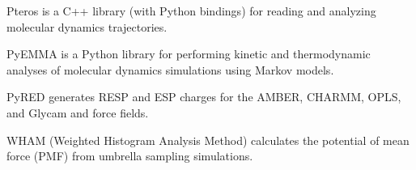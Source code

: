 Pteros \cite{Yesylevskyy_2015} is a C++ library (with Python bindings) for reading and analyzing molecular dynamics trajectories.

PyEMMA \cite{Scherer_2015} is a Python library for performing kinetic and thermodynamic analyses of molecular dynamics simulations using Markov models. 

PyRED \cite{Dupradeau_2010} generates RESP and ESP charges for the AMBER, CHARMM, OPLS, and Glycam and force fields.

WHAM (Weighted Histogram Analysis Method) calculates the potential of mean force (PMF) from umbrella sampling simulations.

